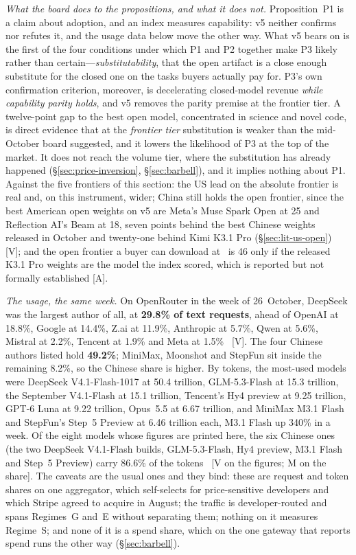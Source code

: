 \emph{What the board does to the propositions, and what it does not.} Proposition~P1 is a claim about adoption, and an index measures capability: v5 neither confirms nor refutes it, and the usage data below move the other way. What v5 bears on is the first of the four conditions under which P1 and P2 together make P3 likely rather than certain---\emph{substitutability}, that the open artifact is a close enough substitute for the closed one on the tasks buyers actually pay for. P3's own confirmation criterion, moreover, is decelerating closed-model revenue \emph{while capability parity holds}, and v5 removes the parity premise at the frontier tier. A twelve-point gap to the best open model, concentrated in science and novel code, is direct evidence that at the \emph{frontier tier} substitution is weaker than the mid-October board suggested, and it lowers the likelihood of P3 at the top of the market. It does not reach the volume tier, where the substitution has already happened (\S\ref{sec:price-inversion}, \S\ref{sec:barbell}), and it implies nothing about P1. Against the five frontiers of this section: the US lead on the absolute frontier is real and, on this instrument, wider; China still holds the open frontier, since the best American open weights on v5 are Meta's Muse Spark Open at 25 and Reflection AI's Beam at 18, seven points behind the best Chinese weights released in October and twenty-one behind Kimi K3.1 Pro (\S\ref{sec:lit-us-open})~\cite{lit-beam-aa} [V]; and the open frontier a buyer can download at \datafreeze\ is 46 only if the released K3.1 Pro weights are the model the index scored, which is reported but not formally established [A].

\emph{The usage, the same week.} On OpenRouter in the week of 26~October, DeepSeek was the largest author of all, at \textbf{29.8\% of text requests}, ahead of OpenAI at 18.8\%, Google at 14.4\%, Z.ai at 11.9\%, Anthropic at 5.7\%, Qwen at 5.6\%, Mistral at 2.2\%, Tencent at 1.9\% and Meta at 1.5\%~\cite{mdl-openrouter-oct26} [V]. The four Chinese authors listed hold \textbf{49.2\%}; MiniMax, Moonshot and StepFun sit inside the remaining 8.2\%, so the Chinese share is higher. By tokens, the most-used models were DeepSeek V4.1-Flash-1017 at 50.4 trillion, GLM-5.3-Flash at 15.3 trillion, the September V4.1-Flash at 15.1 trillion, Tencent's Hy4 preview at 9.25 trillion, GPT-6 Luna at 9.22 trillion, Opus~5.5 at 6.67 trillion, and MiniMax M3.1 Flash and StepFun's Step~5 Preview at 6.46 trillion each, M3.1 Flash up 340\% in a week. Of the eight models whose figures are printed here, the six Chinese ones (the two DeepSeek V4.1-Flash builds, GLM-5.3-Flash, Hy4 preview, M3.1 Flash and Step~5 Preview) carry 86.6\% of the tokens~\cite{mdl-openrouter-oct26} [V on the figures; M on the share]. The caveats are the usual ones and they bind: these are request and token shares on one aggregator, which self-selects for price-sensitive developers and which Stripe agreed to acquire in August; the traffic is developer-routed and spans Regimes~G and~E without separating them; nothing on it measures Regime~S; and none of it is a spend share, which on the one gateway that reports spend runs the other way (\S\ref{sec:barbell}).

